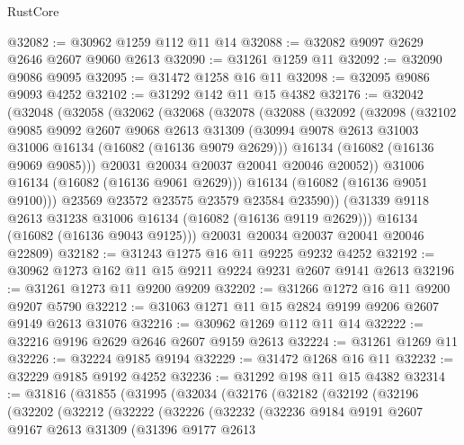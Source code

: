 \begin{lexlean}{RustCore}
\begin{coremodule}
@32082 := @30962 @1259 @112 @11 @14
@32088 := @32082 @9097 @2629 @2646 @2607 @9060 @2613
@32090 := @31261 @1259 @11
@32092 := @32090 @9086 @9095
@32095 := @31472 @1258 @16 @11
@32098 := @32095 @9086 @9093 @4252
@32102 := @31292 @142 @11 @15 @4382
@32176 := @32042
    (@32048
      (@32058
        (@32062
          (@32068
            (@32078
              (@32088
                (@32092
                  (@32098
                    (@32102
                      @9085
                      @9092
                      @2607
                      @9068
                      @2613
                      @31309
                      (@30994 @9078 @2613 @31003 @31006 @16134 (@16082 (@16136 @9079 @2629)))
                      @16134
                      (@16082 (@16136 @9069 @9085)))
                    @20031
                    @20034
                    @20037
                    @20041
                    @20046
                    @20052))
                @31006
                @16134
                (@16082 (@16136 @9061 @2629)))
              @16134
              (@16082 (@16136 @9051 @9100)))
            @23569
            @23572
            @23575
            @23579
            @23584
            @23590))
        (@31339 @9118 @2613 @31238 @31006 @16134 (@16082 (@16136 @9119 @2629)))
        @16134
        (@16082 (@16136 @9043 @9125)))
      @20031
      @20034
      @20037
      @20041
      @20046
      @22809)
@32182 := @31243 @1275 @16 @11 @9225 @9232 @4252
@32192 := @30962 @1273 @162 @11 @15 @9211 @9224 @9231 @2607 @9141 @2613
@32196 := @31261 @1273 @11 @9200 @9209
@32202 := @31266 @1272 @16 @11 @9200 @9207 @5790
@32212 := @31063 @1271 @11 @15 @2824 @9199 @9206 @2607 @9149 @2613 @31076
@32216 := @30962 @1269 @112 @11 @14
@32222 := @32216 @9196 @2629 @2646 @2607 @9159 @2613
@32224 := @31261 @1269 @11
@32226 := @32224 @9185 @9194
@32229 := @31472 @1268 @16 @11
@32232 := @32229 @9185 @9192 @4252
@32236 := @31292 @198 @11 @15 @4382
@32314 := @31816
    (@31855
      (@31995
        (@32034
          (@32176
            (@32182
              (@32192
                (@32196
                  (@32202
                    (@32212
                      (@32222
                        (@32226
                          (@32232
                            (@32236
                              @9184
                              @9191
                              @2607
                              @9167
                              @2613
                              @31309
                              (@31396
                                @9177
                                @2613

\end{coremodule}
\end{lexlean}
